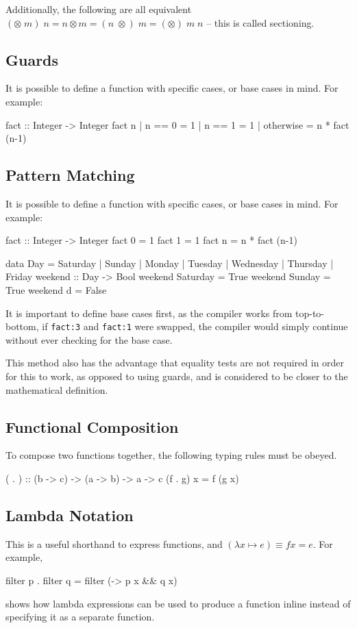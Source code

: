 \documentclass[10pt]{article}
\begin{document}
Additionally, the following are all equivalent $(\otimes\;m)\;n=n\otimes m=(n\;\otimes)\;m=(\otimes)\;m\;n$ -- this is called sectioning.
\subsection{Guards}
It is possible to define a function with specific cases, or base cases in mind.  For example:
\begin{code}
fact :: Integer -> Integer
fact n
  | n == 0 = 1
  | n == 1 = 1
  | otherwise = n * fact (n-1)
\end{code}
\subsection{Pattern Matching}
It is possible to define a function with specific cases, or base cases in mind.  For example:
\begin{code}
fact :: Integer -> Integer
fact 0 = 1
fact 1 = 1
fact n = n * fact (n-1)

data Day = Saturday | Sunday | Monday | Tuesday | Wednesday | Thursday | Friday
weekend :: Day -> Bool
weekend Saturday = True
weekend Sunday = True
weekend d = False
\end{code}
It is important to define base cases first, as the compiler works from top-to-bottom, if \texttt{fact:3} and \texttt{fact:1} were swapped, the compiler would simply continue without ever checking for the base case.

This method also has the advantage that equality tests are not required in order for this to work, as opposed to using guards, and is considered to be closer to the mathematical definition.
\subsection{Functional Composition}
To compose two functions together, the following typing rules must be obeyed.
\begin{code}
( . ) :: (b -> c) -> (a -> b) -> a -> c
(f . g) x = f (g x)
\end{code}
\subsection{Lambda Notation}
This is a useful shorthand to express functions, and $(\lambda x \mapsto e) \equiv f x = e$.  For example,
\begin{code}
filter p . filter q = filter (\x -> p x && q x)
\end{code}
shows how lambda expressions can be used to produce a function inline instead of specifying it as a separate function.
\end{document}
